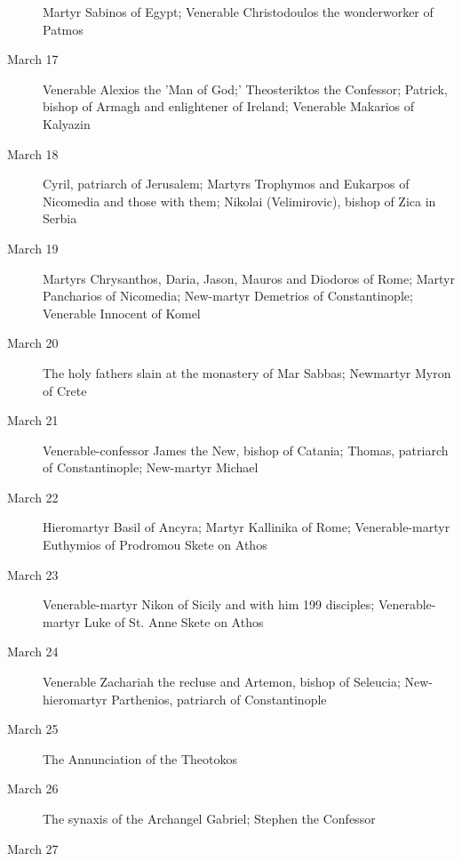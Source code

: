 \begin{description}
Martyr Sabinos of Egypt; Venerable Christodoulos the wonderworker of Patmos

\item[March 17]

Venerable Alexios the 'Man of God;' Theosteriktos the Confessor; Patrick, bishop of Armagh and enlightener of Ireland; Venerable Makarios of Kalyazin

\item[March 18]

Cyril, patriarch of Jerusalem; Martyrs Trophymos and Eukarpos of Nicomedia and those with them; Nikolai (Velimirovic), bishop of Zica in Serbia

\item[March 19]

Martyrs Chrysanthos, Daria, Jason, Mauros and Diodoros of Rome; Martyr Pancharios of Nicomedia; New-martyr Demetrios of Constantinople; Venerable Innocent of Komel

\item[March 20]

The holy fathers slain at the monastery of Mar Sabbas; Newmartyr Myron of Crete

\item[March 21]

Venerable-confessor James the New, bishop of Catania; Thomas, patriarch of Constantinople; New-martyr Michael

\item[March 22]

Hieromartyr Basil of Ancyra; Martyr Kallinika of Rome; Venerable-martyr Euthymios of Prodromou Skete on Athos

\item[March 23]

Venerable-martyr Nikon of Sicily and with him 199 disciples; Venerable-martyr Luke of St. Anne Skete on Athos

\item[March 24]

Venerable Zachariah the recluse and Artemon, bishop of Seleucia; New-hieromartyr Parthenios, patriarch of Constantinople

\item[March 25]

The Annunciation of the Theotokos
\item[March 26]

The synaxis of the Archangel Gabriel; Stephen the Confessor

\item[March 27]


\end{description}
